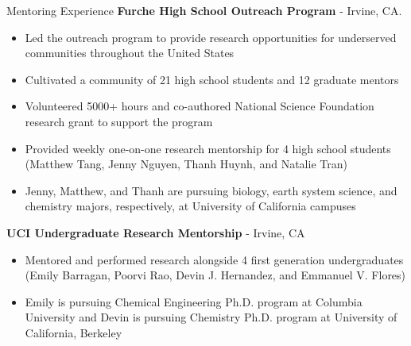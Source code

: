 \begin{rubric}{Mentoring Experience}
   \textbf{Furche High School Outreach Program} - Irvine, CA.
  \vspace{-0.5em}
   \begin{itemize}
     \itemsep-0.5em
   \item Led the outreach program to provide research opportunities for underserved communities
     throughout the United States
   \item Cultivated a community of 21 high school students and
     12 graduate mentors
   \item Volunteered 5000+ hours and co-authored National Science Foundation research grant
     to support the program
   \item Provided weekly one-on-one research mentorship for 4 high school students
     (Matthew Tang, Jenny Nguyen, Thanh Huynh, and Natalie Tran)
   \item Jenny, Matthew, and Thanh are pursuing biology, earth system science, and chemistry
     majors, respectively, at University of California campuses
     \vspace{-1em}
   \end{itemize}
    \textbf{UCI Undergraduate Research Mentorship} - Irvine, CA
   \vspace{-0.5em}
   \begin{itemize}
     \itemsep-0.5em
   \item Mentored and performed research alongside 4 first generation undergraduates
     (Emily Barragan, Poorvi Rao, Devin J. Hernandez, and Emmanuel V. Flores)
   \item Emily is pursuing Chemical Engineering Ph.D. program at Columbia University and
     Devin is pursuing Chemistry Ph.D. program at University of California, Berkeley
     \vspace{-1em}
   \end{itemize}
   

\end{rubric}
